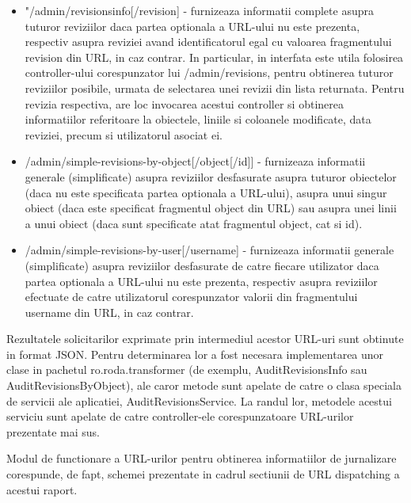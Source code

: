 \begin{itemize}
\item{"/admin/revisionsinfo[/{revision}] - furnizeaza informatii complete asupra tuturor reviziilor daca partea optionala a URL-ului nu este prezenta, respectiv asupra reviziei avand identificatorul egal cu valoarea fragmentului revision din URL, in caz contrar. In particular, in interfata este utila folosirea controller-ului corespunzator lui /admin/revisions, pentru obtinerea tuturor reviziilor posibile, urmata de selectarea unei revizii din lista returnata. Pentru revizia respectiva, are loc invocarea acestui controller si obtinerea informatiilor referitoare la obiectele, liniile si coloanele modificate, data reviziei, precum si utilizatorul asociat ei.}
\item{/admin/simple-revisions-by-object[/{object}[/{id}]] - furnizeaza informatii generale (simplificate) asupra reviziilor desfasurate asupra tuturor obiectelor (daca nu este specificata partea optionala a URL-ului), asupra unui singur obiect (daca este specificat fragmentul object din URL) sau asupra unei linii a unui obiect (daca sunt specificate atat fragmentul object, cat si id).}
\item{/admin/simple-revisions-by-user[/{username}] - furnizeaza informatii generale (simplificate) asupra reviziilor desfasurate de catre fiecare utilizator daca partea optionala a URL-ului nu este prezenta, respectiv asupra reviziilor efectuate de catre utilizatorul corespunzator valorii din fragmentului username din URL, in caz contrar.}
\end{itemize}

Rezultatele solicitarilor exprimate prin intermediul acestor URL-uri sunt obtinute in format JSON. Pentru determinarea lor a fost necesara implementarea unor clase in pachetul ro.roda.transformer (de exemplu, AuditRevisionsInfo sau AuditRevisionsByObject), ale caror metode sunt apelate de catre o clasa speciala de servicii ale aplicatiei, AuditRevisionsService. La randul lor, metodele acestui serviciu sunt apelate de catre controller-ele corespunzatoare URL-urilor prezentate mai sus. 

Modul de functionare a URL-urilor pentru obtinerea informatiilor de jurnalizare corespunde, de fapt, schemei prezentate in cadrul sectiunii de URL dispatching a acestui raport.




